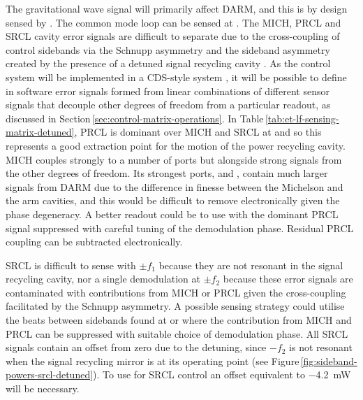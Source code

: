 The gravitational wave signal will primarily affect \gls{DARM}, and this is by design sensed by \ASDC{}. The common mode loop can be sensed at \REFLFIRST{}. The \gls{MICH}, \gls{PRCL} and \gls{SRCL} cavity error signals are difficult to separate due to the cross-coupling of control sidebands via the Schnupp asymmetry and the sideband asymmetry created by the presence of a detuned signal recycling cavity \cite{Hild2007}. As the control system will be implemented in a \LIGO{} \gls{CDS}-style system \cite{Bork2010}, it will be possible to define in software error signals formed from linear combinations of different sensor signals that decouple other degrees of freedom from a particular readout, as discussed in Section\,\ref{sec:control-matrix-operations}. In Table\,\ref{tab:et-lf-sensing-matrix-detuned}, \gls{PRCL} is dominant over \gls{MICH} and \gls{SRCL} at \POPFIRST{} and so this represents a good extraction point for the motion of the power recycling cavity. \gls{MICH} couples strongly to a number of ports but alongside strong signals from the other degrees of freedom. Its strongest ports, \ASDC{} and \ASSECOND{}, contain much larger signals from \gls{DARM} due to the difference in finesse between the Michelson and the arm cavities, and this would be difficult to remove electronically given the phase degeneracy. A better readout could be to use \POPSECOND{} with the dominant \gls{PRCL} signal suppressed with careful tuning of the demodulation phase. Residual \gls{PRCL} coupling can be subtracted electronically.

\gls{SRCL} is difficult to sense with $\pm f_1$ because they are not resonant in the signal recycling cavity, nor a single demodulation at $\pm f_2$ because these error signals are contaminated with contributions from \gls{MICH} or \gls{PRCL} given the cross-coupling facilitated by the Schnupp asymmetry. A possible sensing strategy could utilise the beats between sidebands found at \REFLDIFF{} or \REFLSUM{} where the contribution from \gls{MICH} and \gls{PRCL} can be suppressed with suitable choice of demodulation phase. All \gls{SRCL} signals contain an offset from zero due to the detuning, since $-f_2$ is not resonant when the signal recycling mirror is at its operating point (see Figure\,\ref{fig:sideband-powers-srcl-detuned}). To use \REFLSUM{} for \gls{SRCL} control an offset equivalent to \SI{-4.2}{\milli\watt} will be necessary.

